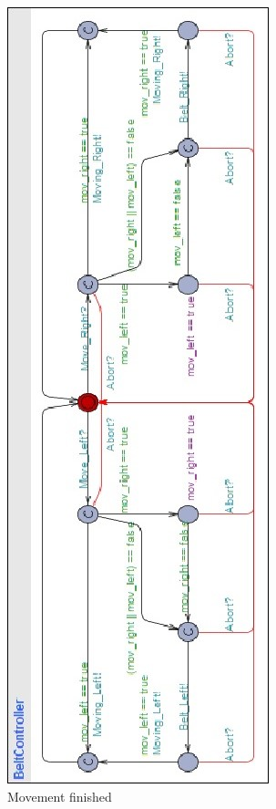 \documentclass[a4paper,oneside,11pt]{report}
\begin{document}
\begin{figure}
\centering
\includegraphics[height=0.75\textheight]{images/BCT1.jpg}
\caption{Movement finished}
\label{fig:bct3}
\end{figure}
\end{document}
